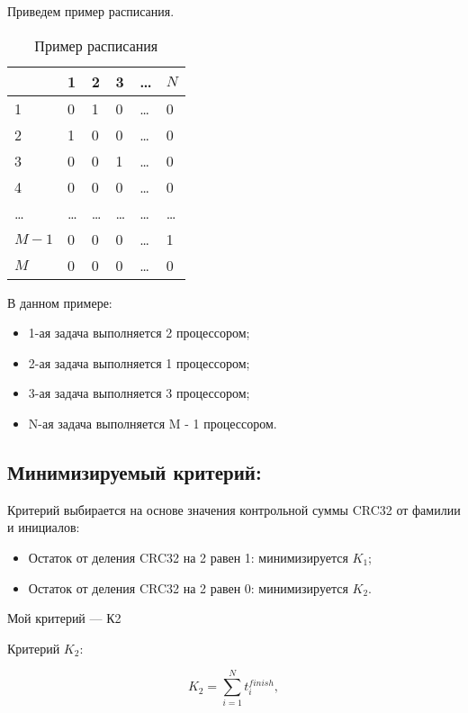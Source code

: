 \documentclass[openany, twoside, a4paper, 12pt]{extbook}
\begin{document}
    \begin{flushleft}
	   Приведем пример расписания. 
    \end{flushleft}
	\begin{table}[h]
	\begin{tabular}{|p{1.8cm}||p{1.8cm}|p{1.8cm}|p{1.8cm}|p{1.8cm}|p{1.8cm}|} 
		\hline
		& 1 & 2 & 3 & \ldots & $ N $ \\ 
		\hline
        \hline
			1 & 0 & 1 & 0 & \ldots & 0 \\ 
		\hline
			2 & 1 & 0 & 0 & \ldots & 0 \\ 
		\hline
			3 & 0 & 0 & 1 & \ldots & 0 \\ 
		\hline
			4 & 0 & 0 & 0 & \ldots & 0 \\ 
		\hline
			\ldots & \ldots  & \ldots  & \ldots  & \ldots & \ldots  \\ 	
		\hline
			$M-1$ & 0 & 0 & 0 & \ldots & 1 \\ 
		\hline
			$M$ & 0 & 0 & 0 & \ldots & 0\\ 
		\hline
	\end{tabular}
		\caption{Пример расписания}
		\label{rasp}
	\end{table}

    \newpage

 	В данном примере:
	\begin{itemize}
		\item 1-ая задача выполняется 2 процессором; 
		\item 2-ая задача выполняется 1 процессором;
		\item 3-ая задача выполняется 3 процессором;
		\item N-ая задача выполняется M - 1 процессором.
	\end{itemize}

	\subsection*{Минимизируемый критерий:}
		
	Критерий выбирается на основе значения контрольной суммы CRC32 от фамилии и инициалов:
	\begin{itemize}
		\label{cr1}
	    \item Остаток от деления CRC32 на 2 равен 1: минимизируется \( K_1 \);
	    \item Остаток от деления CRC32 на 2 равен 0: минимизируется \( K_2 \).
	\end{itemize}
	Мой критерий --- К2
	
    \begin{flushleft}
	Критерий \( K_2 \):       
    \end{flushleft}
	\[
	K_2 = \sum^N_{i=1}t^{finish}_i,
	\]
	
\end{document}
